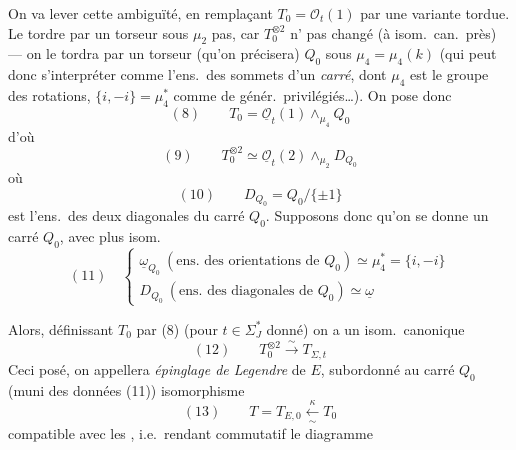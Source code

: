 \documentclass[11pt,a4paper]{article}
\begin{document}
On va lever cette ambiguïté, en remplaçant $T_0 = \mathcal{O}_t(1)$ par une
variante tordue. Le tordre par un torseur sous $\mu_2$ 
 pas, car $T_0^{\otimes 2}$ n' pas changé
(à isom.\ can.\ près) --- on le tordra par un torseur (qu'on précisera)
$Q_0$ sous $\mu_4 = \mu_4(k)$ (qui peut donc s'interpréter comme
l'ens.\ des sommets d'un \emph{carré}, dont $\mu_4$ est le groupe des
rotations,  $\{i, -i\} = \mu_4^*$ comme \struck{\ill{}}
 de génér.\ privilégiés\ldots). On pose donc
\[
  (8) \qquad T_0 = \underline{\mathcal{O}}_t(1) \wedge_{\mu_4} Q_0
\]
d'où
\[
  (9) \qquad T_0^{\otimes 2} \simeq \underline{\mathcal{O}}_t(2) \wedge_{\mu_2} D_{Q_0}
\]
où
\[
  (10) \qquad D_{Q_0} = Q_0/\{\pm 1\}
\]
est l'ens.\ des deux diagonales du carré $Q_0$. Supposons donc qu'on se donne
un carré  $Q_0$, avec plus
isom. 
\[
  (11) \quad
  \begin{cases}
    \underline{\omega}_{Q_0} \ (\text{ens.\ des orientations de } Q_0)
      \simeq \mu_4^* = \{i, -i\} \\
    D_{Q_0} \ (\text{ens.\ des diagonales de } Q_0) \simeq \underline{\omega}
  \end{cases}
\]

Alors, définissant $T_0$ par (8) (pour $t \in \Sigma_J^*$ donné) on a un
isom.\ canonique
\[
  (12) \qquad T_0^{\otimes 2} \xrightarrow{\ \sim\ } T_{\Sigma, t}
\]
Ceci posé, on appellera \struck{\ill{}} \emph{épinglage de Legendre}
de $E$, subordonné au carré $Q_0$ (muni des données (11)) \struck{\ill{}}
 isomorphisme
\[
  (13) \qquad T = T_{E, 0} \xleftarrow[\ \sim\ ]{\ \kappa\ } T_0
\]
compatible avec les , i.e.\ rendant commutatif le
diagramme


\end{document}
